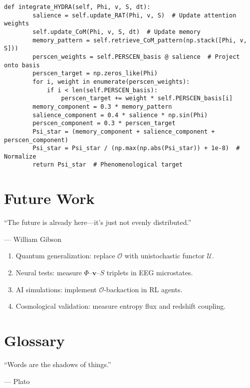 \documentclass[12pt]{book}
\theoremstyle{definition}
\begin{document}
\begin{lstlisting}[caption={HYDRA-RSVP Integration}, label={lst:hydra_code}]
    def integrate_HYDRA(self, Phi, v, S, dt):
        salience = self.update_RAT(Phi, v, S)  # Update attention weights
        self.update_CoM(Phi, v, S, dt)  # Update memory
        memory_pattern = self.retrieve_CoM_pattern(np.stack([Phi, v, S]))
        perscen_weights = self.PERSCEN_basis @ salience  # Project onto basis
        perscen_target = np.zeros_like(Phi)
        for i, weight in enumerate(perscen_weights):
            if i < len(self.PERSCEN_basis):
                perscen_target += weight * self.PERSCEN_basis[i]
        memory_component = 0.3 * memory_pattern
        salience_component = 0.4 * salience * np.sin(Phi)
        perscen_component = 0.3 * perscen_target
        Psi_star = (memory_component + salience_component + perscen_component)
        Psi_star = Psi_star / (np.max(np.abs(Psi_star)) + 1e-8)  # Normalize
        return Psi_star  # Phenomenological target
\end{lstlisting}

\chapter*{Future Work}
\epigraph{``The future is already here—it’s just not evenly distributed.''}{--- William Gibson}

\begin{enumerate}
\item Quantum generalization: replace \(\mathcal{O}\) with unistochastic functor \(\mathcal{U}\).
\item Neural tests: measure \(\Phi\)–\(\mathbf{v}\)–\(S\) triplets in EEG microstates.
\item AI simulations: implement \(\mathcal{O}\)-backaction in RL agents.
\item Cosmological validation: measure entropy flux and redshift coupling.
\end{enumerate}

\chapter*{Glossary}
\epigraph{``Words are the shadows of things.''}{--- Plato}
\end{document}
